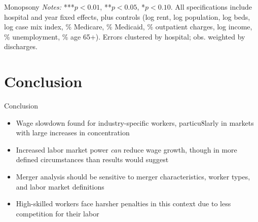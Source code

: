 \documentclass{beamer}
\begin{document}
\begin{frame}{Monopsony}
\medskip
\tiny\emph{Notes:} ***$p<0.01$, **$p<0.05$, *$p<0.10$. All specifications include hospital and year fixed effects, plus controls (log rent, log population, log beds, log case mix index, \% Medicare, \% Medicaid, \% outpatient charges, log income, \% unemployment, \% age 65+). Errors clustered by hospital; obs. weighted by discharges.
\end{frame}

\section{Conclusion}

\begin{frame}{Conclusion}
  \begin{itemize}
    \item Wage slowdown found for industry-specific workers, particu8larly in markets with large increases in concentration
    \item Increased labor market power \textit{can} reduce wage growth, though in more defined circumstances than results would suggest
    \item Merger analysis should be sensitive to merger characteristics, worker types, and labor market definitions 
    \item High-skilled workers face harsher penalties in this context due to less competition for their labor
  \end{itemize}
\end{frame}
\end{document}
